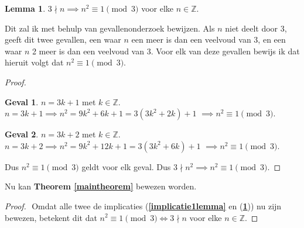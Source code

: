 \documentclass[12pt, dutch, a4paper]{article}
\theoremstyle{definition}
\newtheorem{lemma}{Lemma}[theorem]
\newtheorem{case}{Geval}
\begin{document}
\newpage
\begin{lemma} \label{implicatie2lemma}
    $3 \nmid n \implies n^2 \equiv 1 \pmod{3} $ voor elke $n \in \mathbb{Z}$. 
\end{lemma}

Dit zal ik met behulp van gevallenonderzoek bewijzen. 
Als $n$ niet deelt door 3, geeft dit twee gevallen, een waar $n$ een meer is dan 
een veelvoud van 3, en een waar $n$ 2 meer is dan een veelvoud van 3. Voor elk 
van deze gevallen bewijs ik dat hieruit volgt dat $n^2 \equiv 1 \pmod{3}$.

\begin{proof} 
    \begin{case} $n = 3k + 1$ met $k \in \mathbb{Z}$. \newline
        $n = 3k + 1 \implies n^2 = 9k^2 + 6k + 1 = 3(3k^2 + 2k) + 1$ \newline
        $\implies n^2 \equiv 1 \pmod{3}$.
    \end{case}
    \begin{case} $n = 3k + 2$ met $k \in \mathbb{Z}$. \newline
        $n = 3k + 2 \implies n^2 = 9k^2 + 12k + 1 = 3(3k^2 + 6k) + 1$ \newline
        $\implies n^2 \equiv 1 \pmod{3}$.
    \end{case}
    Dus $n^2 \equiv 1 \pmod{3}$ geldt voor elk geval. \newline
    Dus $3 \nmid n^2 \implies n^2 \equiv 1 \pmod{3}$.
\end{proof}

Nu kan \textbf{Theorem \ref{maintheorem}} bewezen worden.
\begin{proof} $ $ \newline
    Omdat alle twee de implicaties 
    (\textbf{\cref{implicatie1lemma}} en (\textbf{\cref{implicatie2lemma}}))
    nu zijn bewezen, betekent dit dat
    $n^2 \equiv 1 \pmod{3} \iff 3 \nmid n$ voor elke $n \in \mathbb{Z}$.
\end{proof}
\end{document}
